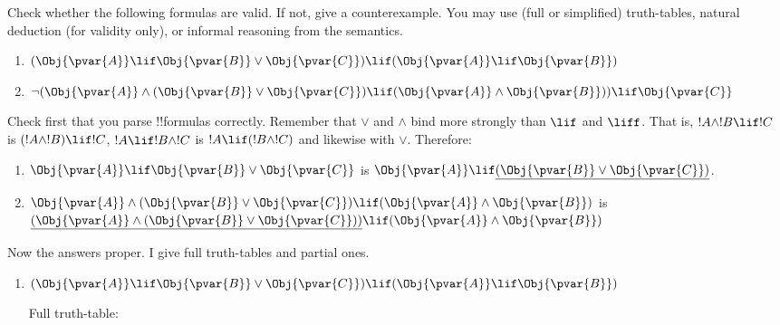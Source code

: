 \documentclass[../../../include/open-logic-section]{subfiles}
\begin{document}


\begin{prob}
    Check whether the following formulas are valid. If not, give a counterexample.
    You may use (full or simplified) truth-tables, natural deduction (for
    validity only), or informal reasoning from the semantics.

    \begin{enumerate}
    \item $(\Obj{\pvar{A}}\lif \Obj{\pvar{B}}\lor
    \Obj{\pvar{C}})\lif(\Obj{\pvar{A}}\lif \Obj{\pvar{B}})$
    \item $\lnot(\Obj{\pvar{A}}\land(\Obj{\pvar{B}}\lor
    \Obj{\pvar{C}})\lif(\Obj{\pvar{A}}\land \Obj{\pvar{B}}))\lif
    \Obj{\pvar{C}}$
    \end{enumerate}

    \begin{ans}
        Check first that you parse !!{formula}s correctly. Remember
        that $\lor$ and $\land$ bind more strongly than $\lif$ and
        $\liff$. That is, $!A\land !B\lif !C$ is $(!A\land !B)\lif !C$,
        $!A\lif!B\land!C$ is $!A\lif(!B\land!C)$ and likewise with $\lor$.
        Therefore:
        \begin{enumerate}
        \item $\Obj{\pvar{A}}\lif \Obj{\pvar{B}}\lor \Obj{\pvar{C}}$
        is  $\Obj{\pvar{A}}\lif \underline{(\Obj{\pvar{B}}\lor \Obj{\pvar{C}})}$.
        \item $\Obj{\pvar{A}}\land(\Obj{\pvar{B}}\lor
        \Obj{\pvar{C}})\lif(\Obj{\pvar{A}}\land \Obj{\pvar{B}})$ is
        $\underline{(\Obj{\pvar{A}}\land(\Obj{\pvar{B}}\lor
        \Obj{\pvar{C}}))}\lif(\Obj{\pvar{A}}\land \Obj{\pvar{B}})$
        \end{enumerate}

    Now the answers proper. I give full truth-tables and partial ones.

    \begin{enumerate} 
    \item $(\Obj{\pvar{A}}\lif \Obj{\pvar{B}}\lor
      \Obj{\pvar{C}})\lif(\Obj{\pvar{A}}\lif \Obj{\pvar{B}})$

      Full truth-table:


\end{enumerate}
\end{ans}
\end{prob}
\end{document}
